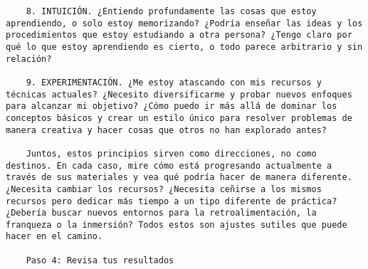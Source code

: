 \begin{verbatim}
	8. INTUICIÓN. ¿Entiendo profundamente las cosas que estoy aprendiendo, o solo estoy memorizando? ¿Podría enseñar las ideas y los procedimientos que estoy estudiando a otra persona? ¿Tengo claro por qué lo que estoy aprendiendo es cierto, o todo parece arbitrario y sin relación?
	
	9. EXPERIMENTACIÓN. ¿Me estoy atascando con mis recursos y técnicas actuales? ¿Necesito diversificarme y probar nuevos enfoques para alcanzar mi objetivo? ¿Cómo puedo ir más allá de dominar los conceptos básicos y crear un estilo único para resolver problemas de manera creativa y hacer cosas que otros no han explorado antes? 
	
	Juntos, estos principios sirven como direcciones, no como destinos. En cada caso, mire cómo está progresando actualmente a través de sus materiales y vea qué podría hacer de manera diferente. ¿Necesita cambiar los recursos? ¿Necesita ceñirse a los mismos recursos pero dedicar más tiempo a un tipo diferente de práctica? ¿Debería buscar nuevos entornos para la retroalimentación, la franqueza o la inmersión? Todos estos son ajustes sutiles que puede hacer en el camino.
	
	Paso 4: Revisa tus resultados
	

\end{verbatim}
